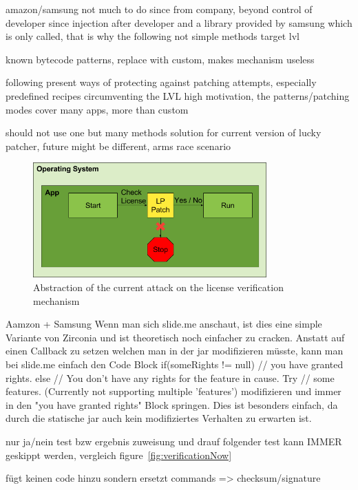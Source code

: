 amazon/samsung not much to do since from company, beyond control of developer since injection after developer and a library provided by samsung which is only called, that is why the following not simple methods target lvl

known bytecode patterns, replace with custom, makes mechanism useless

following present ways of protecting against patching attempts, especially predefined recipes circumventing the LVL
high motivation, the patterns/patching modes cover many apps, more than custom

should not use one but many methods
solution for current version of lucky patcher, future might be different, arms race scenario
\cite{munteanLicense}
%

\begin{figure}[h]
    \centering
    \includegraphics[width=0.8\textwidth]{data/verificationNowAttack.png}
    \caption{Abstraction of the current attack on the license verification mechanism}
    \label{fig:verificationNowAttack}
\end{figure}


Aamzon + Samsung
Wenn man sich slide.me anschaut, ist dies eine simple Variante von Zirconia und ist theoretisch noch einfacher zu cracken. Anstatt auf einen Callback zu setzen welchen man in der jar modifizieren müsste, kann man bei slide.me einfach den Code Block
 if(someRights != null){
        // you have granted rights.
    } else {
        // You don't have any rights for the feature in cause. Try
        // some features. (Currently not supporting multiple 'features')
    }
modifizieren und immer in den "you have granted rights" Block springen. Dies ist besonders einfach, da durch die statische jar auch kein modifiziertes Verhalten zu erwarten ist.


nur ja/nein test bzw ergebnis zuweisung und drauf folgender test kann IMMER geskippt werden, vergleich figure~\ref{fig:verificationNow}



fügt keinen code hinzu sondern ersetzt commands => checksum/signature
